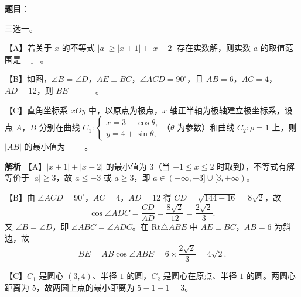 \begin{answer}

\textbf{题目}：

三选一。

【A】若关于 $x$ 的不等式 $|a|\geqslant|x+1|+|x-2|$ 存在实数解，则实数 $a$ 的取值范围是 $\underline{\qquad}$。

【B】如图，$\angle B=\angle D$，$AE\perp BC$，$\angle ACD=90^\circ$，且 $AB=6$，$AC=4$，$AD=12$，则 $BE=\underline{\qquad}$。
\nopagebreak[4]
\begin{center}\end{center}
\nopagebreak[4]
【C】直角坐标系 $xOy$ 中，以原点为极点，$x$ 轴正半轴为极轴建立极坐标系，设点 $A$，$B$ 分别在曲线 $C_1:\begin{cases}x=3+\cos\theta,\\y=4+\sin\theta,\end{cases}$（$\theta$ 为参数）和曲线 $C_2:\rho=1$ 上，则 $|AB|$ 的最小值为 $\underline{\qquad}$。

\textbf{解析}
【A】$|x+1|+|x-2|$ 的最小值为 $3$（当 $-1\leqslant x\leqslant2$ 时取到），不等式有解等价于 $|a|\geqslant3$，故 $a\leqslant-3$ 或 $a\geqslant3$，即 $a\in(-\infty,-3]\cup[3,+\infty)$。

【B】由 $\angle ACD=90^\circ$，$AC=4$，$AD=12$ 得 $CD=\sqrt{144-16}=8\sqrt2$，故
\nopagebreak[4]
\[\cos\angle ADC=\frac{CD}{AD}=\frac{8\sqrt2}{12}=\frac{2\sqrt2}3.\]
又 $\angle B=\angle D$，即 $\angle ABC=\angle ADC$。在 $\mathrm{Rt}\triangle ABE$ 中 $AE\perp BC$，$AB=6$ 为斜边，故
\nopagebreak[4]
\[BE=AB\cos\angle ABE=6\times\frac{2\sqrt2}3=4\sqrt2.\]

【C】$C_1$ 是圆心 $(3,4)$、半径 $1$ 的圆，$C_2$ 是圆心在原点、半径 $1$ 的圆。两圆心距离为 $5$，故两圆上点的最小距离为 $5-1-1=3$。

\gkanswer{答案：A $(-\infty,-3]\cup[3,+\infty)$；B $4\sqrt2$；C $3$。}

\end{answer}
